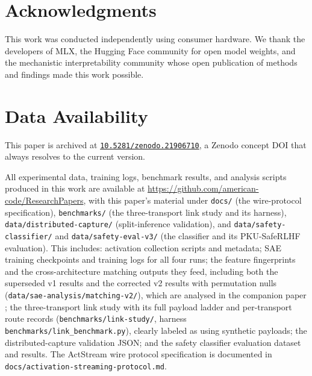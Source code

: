 \documentclass[11pt]{article}
\begin{document}
\section*{Acknowledgments}

This work was conducted independently using consumer hardware. We thank the developers of MLX, the Hugging Face community for open model weights, and the mechanistic interpretability community whose open publication of methods and findings made this work possible.

\section*{Data Availability}

This paper is archived at \href{https://doi.org/10.5281/zenodo.21906710}{\texttt{10.5281/zenodo.21906710}}, a Zenodo concept DOI that always resolves to the current version.

All experimental data, training logs, benchmark results, and analysis scripts produced in this work are available at \url{https://github.com/american-code/ResearchPapers}, with this paper's material under \texttt{docs/} (the wire-protocol specification), \texttt{benchmarks/} (the three-transport link study and its harness), \texttt{data/distributed-capture/} (split-inference validation), and \texttt{data/safety-classifier/} and \texttt{data/safety-eval-v3/} (the classifier and its PKU-SafeRLHF evaluation). This includes: activation collection scripts and metadata; SAE training checkpoints and training logs for all four runs; the feature fingerprints and the cross-architecture matching outputs they feed, including both the superseded v1 results and the corrected v2 results with permutation nulls (\texttt{data/sae-analysis/matching-v2/}), which are analysed in the companion paper \citep{melton2026saecomparison}; the three-transport link study with its full payload ladder and per-transport route records (\texttt{benchmarks/link-study/}, harness \texttt{benchmarks/link\_benchmark.py}), clearly labeled as using synthetic payloads; the distributed-capture validation JSON; and the safety classifier evaluation dataset and results. The ActStream wire protocol specification is documented in \texttt{docs/activation-streaming-protocol.md}.



\end{document}
